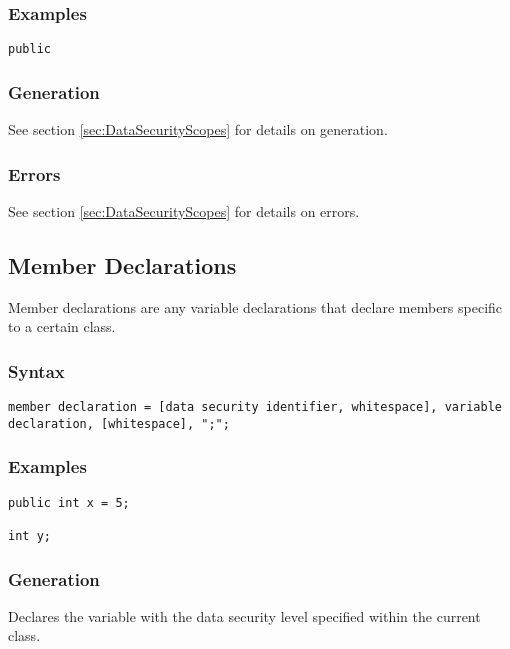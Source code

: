 \documentclass[10pt,a4paper]{article}
\begin{document}
\subsubsection{Examples}
\begin{verbatim}
public
\end{verbatim}

\subsubsection{Generation}
See section \ref{sec:DataSecurityScopes} for details on generation.

\subsubsection{Errors}
See section \ref{sec:DataSecurityScopes} for details on errors.

\newpage







\subsection{Member Declarations}
\label{sec:MemberDeclarations}
Member declarations are any variable declarations that declare members specific to a certain class.

\subsubsection{Syntax}
\begin{verbatim}
member declaration = [data security identifier, whitespace], variable declaration, [whitespace], ";";
\end{verbatim}

\subsubsection{Examples}
\begin{verbatim}
public int x = 5;

int y;
\end{verbatim}

\subsubsection{Generation}
Declares the variable with the data security level specified within the current class.
\end{document}
